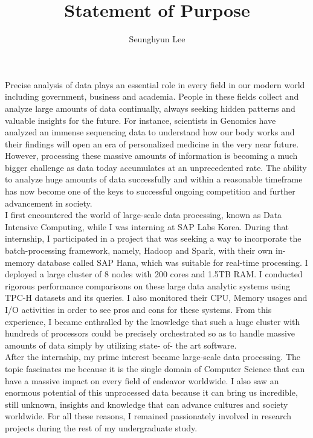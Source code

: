 \documentclass[11pt]{article}
\title {Statement of Purpose}
\author{Seunghyun Lee}
\begin{document}
\maketitle

  Precise analysis of data plays an essential role in every field in our modern world including government, business and academia. People in these fields collect and analyze large amounts of data continually, always seeking hidden patterns and valuable insights for the future. For instance, scientists in Genomics have analyzed an immense sequencing data to understand how our body works and their findings will open an era of personalized medicine in the very near future. However, processing these massive amounts of information is becoming a much bigger challenge as data today accumulates at an unprecedented rate. The ability to analyze huge amounts of data successfully and within a reasonable timeframe has now become one of the keys to successful ongoing competition and further advancement in society.\\

  I first encountered the world of large-scale data processing, known as Data Intensive Computing, while I was interning at SAP Labs Korea. During that internship, I participated in a project that was seeking a way to incorporate the batch-processing framework, namely, Hadoop and Spark, with their own in-memory database called SAP Hana, which was suitable for real-time processing. I deployed a large cluster of 8 nodes with 200 cores and 1.5TB RAM. I conducted rigorous performance comparisons on these large data analytic systems using TPC-H datasets and its queries. I also monitored their CPU, Memory usages and I/O activities in order to see pros and cons for these systems. From this experience, I became enthralled by the knowledge that such a huge cluster with hundreds of processors could be precisely orchestrated so as to handle massive amounts of data simply by utilizing state- of- the art software. \\

  After the internship, my prime interest became large-scale data processing. The topic fascinates me because it is the single domain of Computer Science that can have a massive impact on every field of endeavor worldwide. I also saw an enormous potential of this unprocessed data because it can bring us incredible, still unknown, insights and knowledge that can advance cultures and society worldwide. For all these reasons, I remained passionately involved in research projects during the rest of my undergraduate study. \\
\end{document}
